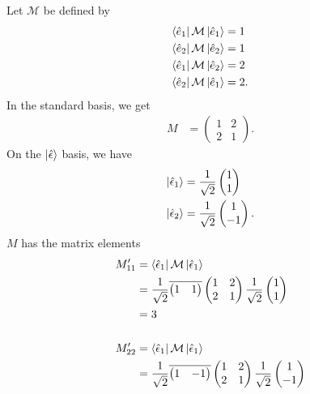 \documentclass[10pt]{mypackage}
\begin{document}
\begin{example}
  Let $\mathcal{M}$ be defined by
  \begin{align*}
    \bra{\hat{e}_1}\mathcal{M}\ket{\hat{e}_1} &= 1\\
    \bra{\hat{e}_2}\mathcal{M}\ket{\hat{e}_2} &= 1\\
    \bra{\hat{e}_1}\mathcal{M}\ket{\hat{e}_2} &= 2\\
    \bra{\hat{e}_2}\mathcal{M}\ket{\hat{e}_1} &= 2.
  \end{align*}
  In the standard basis, we get
  \begin{align*}
    M &= \begin{pmatrix}1 & 2 \\ 2 & 1\end{pmatrix}.
  \end{align*}
  On the $\ket{\hat{\epsilon}}$ basis, we have
  \begin{align*}
    \ket{\hat{\epsilon}_1} &= \frac{1}{\sqrt{2}} \begin{pmatrix}1\\1\end{pmatrix}\\
    \ket{\hat{\epsilon}_2} &= \frac{1}{\sqrt{2}} \begin{pmatrix}1\\-1\end{pmatrix}.
  \end{align*}
  $M$ has the matrix elements
  \begin{align*}
    M_{11}' &= \bra{\hat{\epsilon}_1}\mathcal{M}\ket{\hat{\epsilon}_1}\\
            &= \frac{1}{\sqrt{2}} \overline{ \begin{pmatrix}1 & 1\end{pmatrix} } \begin{pmatrix}1 & 2 \\ 2 & 1\end{pmatrix} \frac{1}{\sqrt{2}} \begin{pmatrix}1\\1\end{pmatrix}\\
            &= 3\\
            \\
    M_{22}' &= \bra{\hat{\epsilon}_1}\mathcal{M}\ket{\hat{\epsilon}_1}\\
            &= \frac{1}{\sqrt{2}} \overline{ \begin{pmatrix}1 & -1\end{pmatrix} } \begin{pmatrix}1 & 2 \\ 2 & 1\end{pmatrix} \frac{1}{\sqrt{2}} \begin{pmatrix}1\\-1\end{pmatrix}\\

\end{align*}
\end{example}
\end{document}
